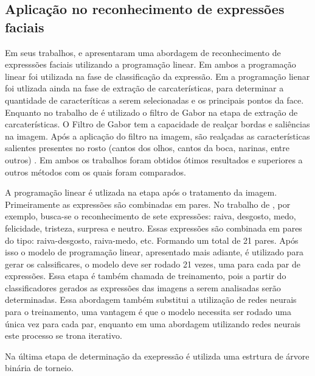 \subsection{Aplicação no reconhecimento de expressões faciais}

Em seus trabalhos,  e  apresentaram uma abordagem de reconhecimento de expresssões faciais utilizando a programação linear. Em ambos a programação linear foi utilizada na fase de classificação da expressão. Em  a programação lienar foi utlizada ainda na fase de extração de carcaterísticas, para determinar a quantidade de caracteríticas a serem selecionadas e os principais pontos da face. Enquanto no trabalho de \cite{Feng} é utilizado o filtro de Gabor na etapa de extração de carcaterísticas. O Filtro de Gabor tem a capacidade de realçar bordas e saliências na imagem. Após a aplicação do filtro na imagem, são realçadas as características salientes presentes no rosto (cantos dos olhos, cantos da boca, narinas, entre outros) \cite{Gabor}. Em ambos os trabalhos foram obtidos ótimos resultados e superiores a outros métodos com os quais foram comparados. 

A programação linear é utlizada na etapa após o tratamento da imagem. Primeiramente as expressões são combinadas em pares. No trabalho de \cite{Feng}, por exemplo, busca-se o reconhecimento de sete expressões: raiva, desgosto, medo, felicidade, tristeza, surpresa e neutro. Essas expressões são combinada em pares do tipo: raiva-desgosto, raiva-medo, etc. Formando um total de 21 pares. Após isso o modelo de programação linear, apresentado mais adiante, é utilizado para gerar os calssificares, o modelo deve ser rodado 21 vezes, uma para cada par de expressões. Essa etapa é também chamada de treinamento, pois a partir do classificadores gerados as expressões das imagens a serem analisadas serão determinadas. Essa abordagem também substitui a utilização de redes neurais para o treinamento, uma vantagem é que o modelo necessita ser rodado uma única vez para cada par, enquanto em uma abordagem utilizando redes neurais este processo se trona iterativo.

Na última etapa de determinação da exepressão é utilizda uma estrtura de árvore binária de torneio.

